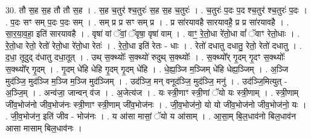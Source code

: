 \documentclass[17pt]{extarticle}
\begin{document}
30. तौ स॒ह स॒ह तौ तौ स॒ह । . स॒ह च॒तुर॑ श्च॒तुरः॑ स॒ह स॒ह च॒तुरः॑ । . च॒तुरः॑ प॒दः प॒द श्च॒तुर॑ श्च॒तुरः॑ प॒दः । . प॒दः सꣳ सम् प॒दः प॒दः सम् । . सम् प्र प्र सꣳ सम् प्र । . प्र सा॑रयावहै सारयावहै॒ प्र प्र सा॑रयावहै । . सा॒र॒या॒व॒हा॒ इति॑ सारयावहै । . वृषा॑ वां ॅवां॒ ॅवृषा॒ वृषा॑ वाम् । . वाꣳ॒॒ रे॒तो॒धा रे॑तो॒धा वां᳚ ॅवाꣳ रेतो॒धाः । . रे॒तो॒धा रेतो॒ रेतो॑ रेतो॒धा रे॑तो॒धा रेतः॑ । . रे॒तो॒धा इति॑ रेतः - धाः । . रेतो॑ दधातु दधातु॒ रेतो॒ रेतो॑ दधातु । . द॒धा॒ तूदुद् द॑धातु दधा॒तूत् । . उथ् स॒क्थ्योः᳚ स॒क्थ्यो॑ रुदुथ् स॒क्थ्योः᳚ । . स॒क्थ्यो᳚र् गृ॒दम् गृ॒दꣳ स॒क्थ्योः᳚ स॒क्थ्यो᳚र् गृ॒दम् । . गृ॒दम् धे॑हि धेहि गृ॒दम् गृ॒दम् धे॑हि । . धे॒ह्य॒ञ्जि म॒ञ्जिम् धे॑हि धेह्य॒ञ्जिम् । . अ॒ञ्जि मुद॑ञ्जि॒ मुद॑ञ्जि म॒ञ्जि म॒ञ्जि मुद॑ञ्जिम् । . उद॑ञ्जि॒ मन् वनूद॑ञ्जि॒ मुद॑ञ्जि॒ मनु॑ । . उद॑ञ्जि॒मित्युत् - अ॒ञ्जि॒म् । . अन्व॑जा॒ जान्वन् व॑ज । . अ॒जेत्य॑ज । . यः स्त्री॒णाꣳ स्त्री॒णां ॅयो यः स्त्री॒णाम् । . स्त्री॒णाम् जी॑व॒भोज॑नो जीव॒भोज॑नः स्त्री॒णाꣳ स्त्री॒णाम् जी॑व॒भोज॑नः । . जी॒व॒भोज॑नो॒ यो यो जी॑व॒भोज॑नो जीव॒भोज॑नो॒ यः । . जी॒व॒भोज॑न॒ इति॑ जीव - भोज॑नः । . य आ॑सा मासां॒ ॅयो य आ॑साम् । . आ॒सा॒म् बि॒ल॒धाव॑नो बिल॒धाव॑न आसा मासाम् बिल॒धाव॑नः । \newline
\end{document}

